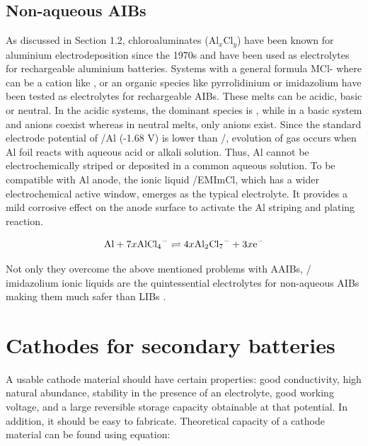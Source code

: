 \subsection{Non-aqueous AIBs}
As discussed in Section 1.2, chloroaluminates (Al$_x$Cl$_y$) have been known for aluminium electrodeposition since the 1970s and have been used as electrolytes for rechargeable aluminium batteries\cite{weppner_ionic_1976, fung_reaction_1972}. Systems with a general formula MCl- where  can be a cation like ,  or an organic species like pyrrolidinium or imidazolium have been tested as electrolytes for rechargeable AIBs\cite{das_aluminium-ion_2017}. These melts can be acidic, basic or neutral. In the acidic systems, the dominant species is , while in a basic system  and  anions coexist whereas in neutral melts, only  anions exist. Since the standard electrode potential of /Al (-1.68 V) is lower than /, evolution of  gas occurs when Al foil reacts with aqueous acid or alkali solution. Thus, Al cannot be electrochemically striped or deposited in a common aqueous solution. To be compatible with Al anode, the ionic liquid /EMImCl, which has a wider electrochemical active window, emerges as the typical electrolyte. It provides a mild corrosive effect on the anode surface to activate the Al striping and plating reaction. 

\begin{align*}
        \ce{Al} + 7x\ce{AlCl4-} \rightleftharpoons 4x\ce{Al2Cl7-} + 3x\ce{e-}
\end{align*}

Not only they overcome the above mentioned problems with AAIBs, / imidazolium ionic liquids are the quintessential electrolytes for non-aqueous AIBs making them much safer than LIBs \cite{jayaprakash_rechargeable_2011, lin_ultrafast_2015-3,wang_new_2013-1,rani_fluorinated_2013}. 

\section{Cathodes for secondary batteries}
A usable cathode material should have certain properties: good conductivity, high natural abundance, stability in the presence of an electrolyte, good working voltage, and a large reversible storage capacity obtainable at that potential. In addition, it should be easy to fabricate. Theoretical capacity of a cathode material can be found using equation:

